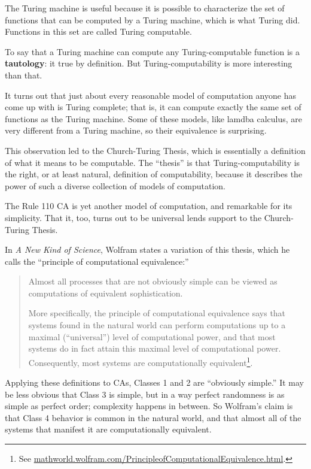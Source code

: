 \documentclass[10pt]{book}
\begin{document}
The Turing machine is useful because it is possible to characterize
the set of functions that can be computed by a Turing machine,
which is what Turing did.  Functions in this set are
called Turing computable.

To say that a Turing machine can compute any Turing-computable
function is a {\bf tautology}: it true by definition.  But
Turing-computability is more interesting than that.

It turns out that just about every reasonable model of computation
anyone has come up with is Turing complete; that is, it can compute
exactly the same set of functions as the Turing machine.
Some of these models, like lamdba calculus, are very different
from a Turing machine, so their equivalence is surprising.

This observation led to the Church-Turing Thesis, which is essentially
a definition of what it means to be computable.  The ``thesis'' is
that Turing-computability is the right, or at least natural,
definition of computability, because it describes the power of such a
diverse collection of models of computation.

The Rule 110 CA is yet another model of computation, and remarkable
for its simplicity.  That it, too, turns out to be universal lends
support to the Church-Turing Thesis.

In {\em A New Kind of Science}, Wolfram states a variation of this
thesis, which he calls the ``principle of computational equivalence:''

\begin{quote}
Almost all processes that are not obviously simple can be viewed as
computations of equivalent sophistication.

More specifically, the principle of computational equivalence says
that systems found in the natural world can perform computations up to
a maximal (``universal'') level of computational power, and that most
systems do in fact attain this maximal level of computational
power. Consequently, most systems are computationally
equivalent\footnote{See
  \url{mathworld.wolfram.com/PrincipleofComputationalEquivalence.html}.}.
\end{quote}

Applying these definitions to CAs, Classes 1 and 2 are ``obviously
simple.''  It may be less obvious that Class 3 is simple, but in a way
perfect randomness is as simple as perfect order; complexity happens
in between.  So Wolfram's claim is that Class 4 behavior is common in
the natural world, and that almost all of the systems that manifest it
are computationally equivalent.
\end{document}
